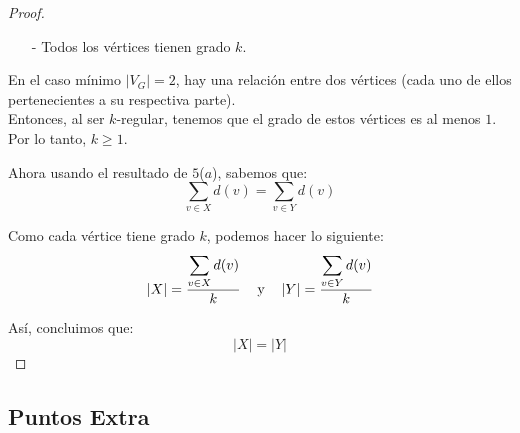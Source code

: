 \documentclass{article}
\begin{document}
\begin{enumerate}
\begin{enumerate}
\begin{proof}
\begin{itemize}
            \item[-] Todos los v\'ertices tienen grado $k$.
          \end{itemize}

          En el caso mínimo $|V_G| = 2$, hay una relaci\'on entre
          dos v\'ertices (cada uno de ellos pertenecientes a su respectiva
          parte). \\
          Entonces, al ser $k$-regular, tenemos que el grado
          de estos v\'ertices es al menos $1$. \\
          Por lo tanto, $k \geq 1$.

          Ahora usando el resultado de $5$($a$), sabemos que:
          $$\sum_{v \in X} d(v) = \sum_{v \in Y} d(v)$$

          Como cada v\'ertice tiene grado $k$, podemos hacer lo siguiente:
          $$\abs{X} = \frac{\displaystyle \sum_{v \in X} d(v)}{k} \text{\hspace{0.3cm}
            \text{y} \hspace{0.3cm}} \abs{Y} = \frac{\displaystyle \sum_{v \in Y} d(v)}{k}$$

          As\'i, concluimos que:
          $$|X| = |Y|$$
        \end{proof}
    \end{enumerate}
\end{enumerate}

\subsection*{Puntos Extra}
\end{document}
